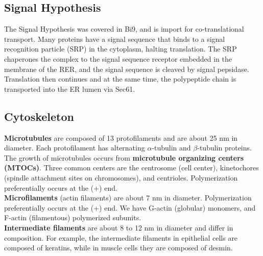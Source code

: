 \documentclass{article}
\theoremstyle{plain}%
\theoremstyle{definition}
\theoremstyle{remark}
\begin{document}
\subsection{Signal Hypothesis}
The Signal Hypothesis was covered in Bi9, and is import for co-translational transport. Many proteins have a signal sequence that binds to a signal recognition particle (SRP) in the cytoplasm, halting translation. The SRP chaperones the complex to the signal sequence receptor embedded in the membrane of the RER, and the signal sequence is cleaved by signal pepsidase. Translation then continues and at the same time, the polypeptide chain is transported into the ER lumen via Sec61. 

\subsection{Cytoskeleton}
\textbf{Microtubules} are composed of 13 protofilaments and are about 25 nm in diameter. Each protofilament has alternating $\alpha$-tubulin and $\beta$-tubulin proteins. The growth of microtubules occurs from \textbf{microtubule organizing centers (MTOCs)}. Three common centers are the centrosome (cell center), kinetochores (spindle attachment sites on chromosomes), and centrioles. Polymerization preferentially occurs at the (+) end.\\
\indent \textbf{Microfilaments} (actin filaments) are about 7 nm in diameter. Polymerization preferentially occurs at the (+) end. We have G-actin (globular) monomers, and F-actin (filamentous) polymerized subunits. \\
\indent \textbf{Intermediate filaments} are about 8 to 12 nm in diameter and differ in composition. For example, the intermediate filaments in epithelial cells are composed of keratins, while in muscle cells they are composed of desmin. 
\end{document}
